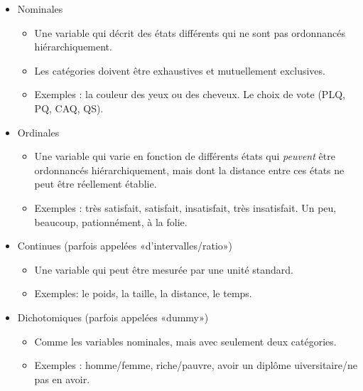 \documentclass[
]{book}
\providecommand{\tightlist}{%
  \setlength{\itemsep}{0pt}\setlength{\parskip}{0pt}}
\begin{document}
\begin{itemize}
\tightlist
\item
  Nominales

  \begin{itemize}
  \tightlist
  \item
    Une variable qui décrit des états différents qui ne sont pas ordonnancés hiérarchiquement.
  \item
    Les catégories doivent être exhaustives et mutuellement exclusives.
  \item
    Exemples : la couleur des yeux ou des cheveux. Le choix de vote (PLQ, PQ, CAQ, QS).
  \end{itemize}
\item
  Ordinales

  \begin{itemize}
  \tightlist
  \item
    Une variable qui varie en fonction de différents états qui \emph{peuvent} être ordonnancés hiérarchiquement, mais dont la distance entre ces états ne peut être réellement établie.
  \item
    Exemples : très satisfait, satisfait, insatisfait, très insatisfait. Un peu, beaucoup, pationnément, à la folie.
  \end{itemize}
\item
  Continues (parfois appelées «d'intervalles/ratio»)

  \begin{itemize}
  \tightlist
  \item
    Une variable qui peut être mesurée par une unité standard.
  \item
    Exemples: le poids, la taille, la distance, le temps.
  \end{itemize}
\item
  Dichotomiques (parfois appelées «dummy»)

  \begin{itemize}
  \tightlist
  \item
    Comme les variables nominales, mais avec seulement deux catégories.
  \item
    Exemples : homme/femme, riche/pauvre, avoir un diplôme uiversitaire/ne pas en avoir.
  \end{itemize}
\end{itemize}
\end{document}
